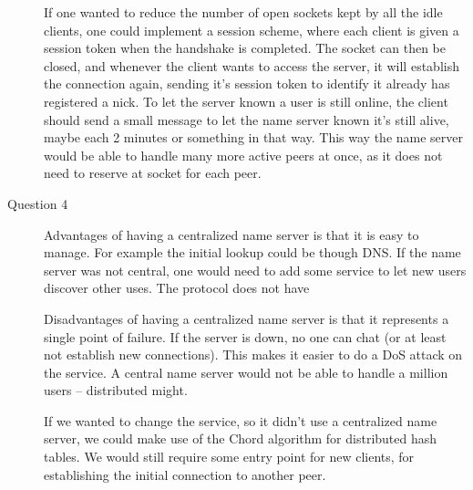 \begin{description}
        If one wanted to reduce the number of open sockets kept by all the idle clients, one could implement a session scheme, where each client is given a session token when the handshake is completed. The socket can then be closed, and whenever the client wants to access the server, it will establish the connection again, sending it's session token to identify it already has registered a nick. To let the server known a user is still online, the client should send a small message to let the name server known it's still alive, maybe each 2 minutes or something in that way. This way the name server would be able to handle many more active peers at once, as it does not need to reserve at socket for each peer.

    \item[Question 4]
        Advantages of having a centralized name server is that it is easy to manage. For example the initial lookup could be though DNS. If the name server was not central, one would need to add some service to let new users discover other uses.
        The protocol does not have

        Disadvantages of having a centralized name server is that it represents a single point of failure. If the server is down, no one can chat (or at least not establish new connections). This makes it easier to do a DoS attack on the service. A central name server would not be able to handle a million users -- distributed might.

        If we wanted to change the service, so it didn't use a centralized name server, we could make use of the Chord algorithm for distributed hash tables. We would still require some entry point for new clients, for establishing the initial connection to another peer.


\end{description}
